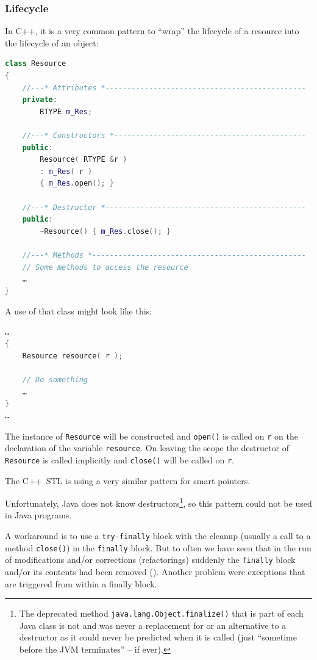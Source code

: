 \subsubsection{Lifecycle}\label{sec:Lifecycle}
In C++, it is a very common pattern to “wrap” the lifecycle of a resource into the lifecycle of an object:
\begin{lstlisting}[language=C++]
class Resource
{
    //---* Attributes *----------------------------------------------
    private:
        RTYPE m_Res;

    //---* Constructors *--------------------------------------------
    public:
        Resource( RTYPE &r )
        : m_Res( r )
        { m_Res.open(); }

    //---* Destructor *----------------------------------------------
    public:
        ~Resource() { m_Res.close(); }

    //---* Methods *-------------------------------------------------
    // Some methods to access the resource
    …
}
\end{lstlisting}

A use of that class might look like this:
\begin{lstlisting}[language=c++]
…
{
    Resource resource( r );

    // Do something
    …
}
…
\end{lstlisting}

The instance of \lstinline|Resource| will be constructed and \lstinline|open()| is called on \lstinline|r| on the declaration of the variable \lstinline|resource|. On leaving the scope the destructor of \lstinline|Resource| is called implicitly and \lstinline|close()| will be called on \lstinline|r|.

The C++~STL is using a very similar pattern for smart pointers.

Unfortunately, Java does not know destructors\footnote{The deprecated method \lstinline|java.lang.Object.finalize()|\autocite{ORACLE_DOC_OBJECT:finalize} that is part of each Java class is not and was never a replacement for or an alternative to a destructor as it could never be predicted when it is called (just “sometime before the JVM terminates” – if ever).}, so this pattern could not be used in Java programs.

A workaround is to use a \verb#try-finally# block with the cleanup (usually a call to a method \lstinline|close()|) in the \lstinline|finally| block. But to often we have seen that in the run of modifications and/or corrections (refactorings) suddenly the \lstinline|finally| block and/or its contents had been removed (). Another problem were exceptions that are triggered from within a finally block.

